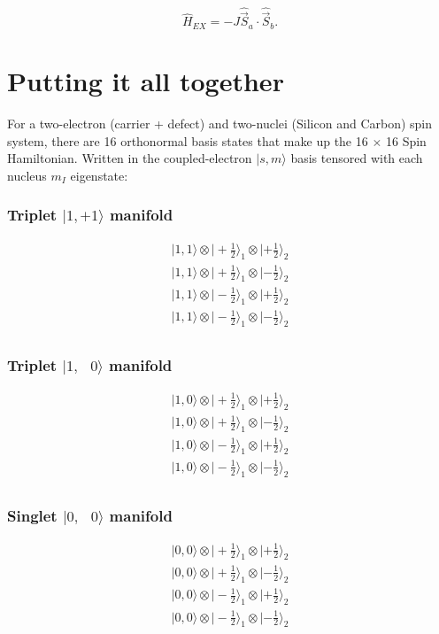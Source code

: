 \documentclass[svgnames]{article}
\begin{document}
\vspace{5px}
\begin{pinkbox}
     \[   \hat{H}_{EX} = -J \hat{\vec{S}}_a \cdot \hat{\vec{S}}_b. 
     \]
\end{pinkbox}
\vspace{5px}

\section{Putting it all together}

For a two-electron (carrier + defect) and two-nuclei (Silicon and Carbon) spin
system, there are 16 orthonormal basis states that make up the 16 $\times$ 16
Spin Hamiltonian. Written in the coupled-electron  $|s, m\rangle$ basis tensored
with each nucleus  $m_I$ eigenstate: 

\subsubsection*{Triplet  $|1, +1\rangle$ manifold}
\begin{align*}
  |1, 1\rangle \otimes |+\frac{1}{2}\rangle_1 \otimes | +\frac{1}{2} \rangle_2 \\ 
  |1, 1\rangle \otimes |+\frac{1}{2}\rangle_1 \otimes | -\frac{1}{2} \rangle_2 \\ 
  |1, 1\rangle \otimes |-\frac{1}{2}\rangle_1 \otimes | +\frac{1}{2} \rangle_2 \\ 
  |1, 1\rangle \otimes |-\frac{1}{2}\rangle_1 \otimes | -\frac{1}{2} \rangle_2 \\ 
\end{align*}
\subsubsection*{Triplet  $|1, \;\;\,0\rangle$ manifold}
\begin{align*}
  |1, 0\rangle \otimes |+\frac{1}{2}\rangle_1 \otimes | +\frac{1}{2} \rangle_2 \\ 
  |1, 0\rangle \otimes |+\frac{1}{2}\rangle_1 \otimes | -\frac{1}{2} \rangle_2 \\ 
  |1, 0\rangle \otimes |-\frac{1}{2}\rangle_1 \otimes | +\frac{1}{2} \rangle_2 \\ 
  |1, 0\rangle \otimes |-\frac{1}{2}\rangle_1 \otimes | -\frac{1}{2} \rangle_2 \\ 
\end{align*}
\subsubsection*{Singlet  $|0, \;\;\,0\rangle$ manifold}
\begin{align*}
  |0, 0\rangle \otimes |+\frac{1}{2}\rangle_1 \otimes | +\frac{1}{2} \rangle_2 \\ 
  |0, 0\rangle \otimes |+\frac{1}{2}\rangle_1 \otimes | -\frac{1}{2} \rangle_2 \\ 
  |0, 0\rangle \otimes |-\frac{1}{2}\rangle_1 \otimes | +\frac{1}{2} \rangle_2 \\ 
  |0, 0\rangle \otimes |-\frac{1}{2}\rangle_1 \otimes | -\frac{1}{2} \rangle_2 \\ 
\end{align*}
\end{document}
